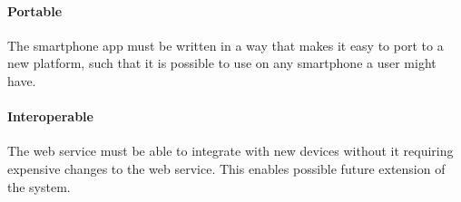 \paragraph{Portable}
The smartphone app must be written in a way that makes it easy to port to a new platform, such that it is possible to use on any smartphone a user might have.

\paragraph{Interoperable}
The web service must be able to integrate with new devices without it requiring expensive changes to the web service. This enables possible future extension of the system.
